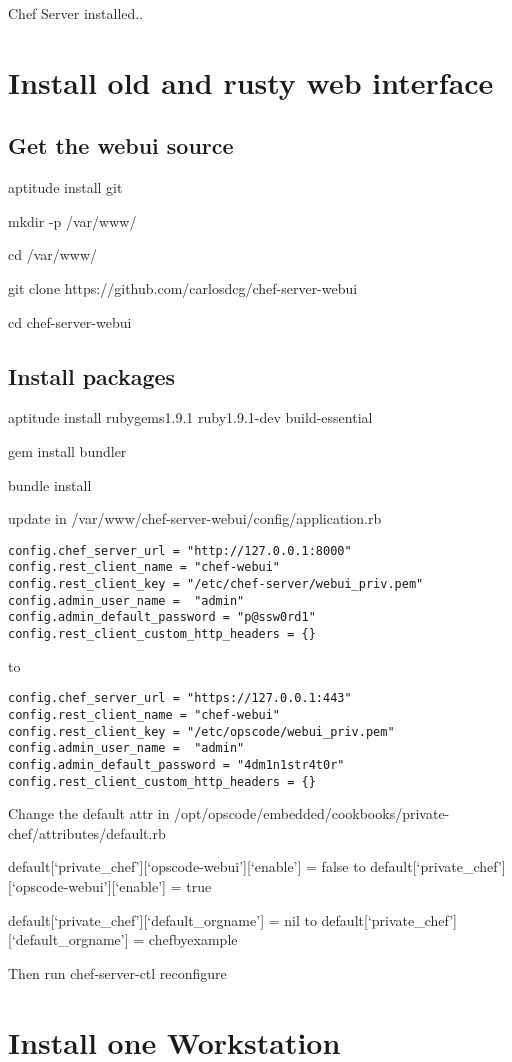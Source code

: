 
Chef Server installed..

\section{Install old and rusty web interface}

\subsection{Get the webui source}

aptitude install git

mkdir -p /var/www/

cd /var/www/

git clone https://github.com/carlosdcg/chef-server-webui

cd chef-server-webui

\subsection{Install packages}

aptitude install rubygems1.9.1 ruby1.9.1-dev build-essential

gem install bundler

bundle install

update in /var/www/chef-server-webui/config/application.rb

\begin{verbatim}
config.chef_server_url = "http://127.0.0.1:8000"
config.rest_client_name = "chef-webui"
config.rest_client_key = "/etc/chef-server/webui_priv.pem"
config.admin_user_name =  "admin"
config.admin_default_password = "p@ssw0rd1"
config.rest_client_custom_http_headers = {}
\end{verbatim}

to

\begin{verbatim}
config.chef_server_url = "https://127.0.0.1:443"
config.rest_client_name = "chef-webui"
config.rest_client_key = "/etc/opscode/webui_priv.pem"
config.admin_user_name =  "admin"
config.admin_default_password = "4dm1n1str4t0r"
config.rest_client_custom_http_headers = {}
\end{verbatim}

Change the default attr in /opt/opscode/embedded/cookbooks/private-chef/attributes/default.rb

default[`private\_chef'][`opscode-webui'][`enable'] = false
to
default[`private\_chef'][`opscode-webui'][`enable'] = true

default[`private\_chef'][`default\_orgname'] = nil
to
default[`private\_chef'][`default\_orgname'] = chefbyexample

Then run
chef-server-ctl reconfigure

\section{Install one Workstation}